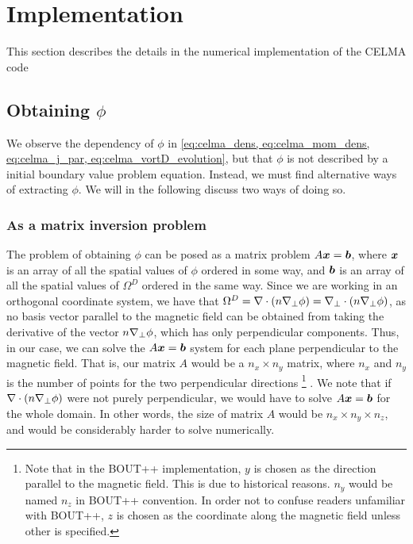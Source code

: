 \section{Implementation}
%
\label{sec:implementation}
This section describes the details in the numerical implementation of the CELMA code

\subsection{Obtaining \texorpdfstring{$\phi$}{the potential}}
%
We observe the dependency of $\phi$ in \cref{eq:celma_dens, eq:celma_mom_dens, eq:celma_j_par, eq:celma_vortD_evolution}, but that $\phi$ is not described by a initial boundary value problem equation.
Instead, we must find alternative ways of extracting $\phi$.
We will in the following discuss two ways of doing so.

\subsubsection{As a matrix inversion problem}
%
The problem of obtaining $\phi$ can be posed as a matrix problem $A\boldsymbol{x}=\boldsymbol{b}$, where $\boldsymbol{x}$ is an array of all the spatial values of $\phi$ ordered in some way, and $\boldsymbol{b}$ is an array of all the spatial values of $\Omega^D$ ordered in the same way.
Since we are working in an orthogonal coordinate system, we have that $\Omega^D = \nabla\cdot\left(n\nabla_\perp\phi\right) = \nabla_\perp\cdot\left(n\nabla_\perp\phi\right)$, as no basis vector parallel to the magnetic field can be obtained from taking the derivative of the vector $n\nabla_\perp\phi$, which has only perpendicular components.
Thus, in our case, we can solve the $A\boldsymbol{x}=\boldsymbol{b}$ system for each plane perpendicular to the magnetic field.
That is, our matrix $A$ would be a $n_x \times n_y$ matrix, where $n_x$ and $n_y$ is the number of points for the two perpendicular directions
%
\footnote{
Note that in the BOUT++ implementation, $y$ is chosen as the direction parallel to the magnetic field.
This is due to historical reasons.
$n_y$ would be named $n_z$ in BOUT++ convention.
In order not to confuse readers unfamiliar with BOUT++, $z$ is chosen as the coordinate along the magnetic field unless other is specified.
}%
%
.
We note that if $\nabla\cdot\left(n\nabla_\perp\phi\right)$ were not purely perpendicular, we would have to solve $A\boldsymbol{x}=\boldsymbol{b}$ for the whole domain.
In other words, the size of matrix $A$ would be $n_x \times n_y \times n_z$, and would be considerably harder to solve numerically.

